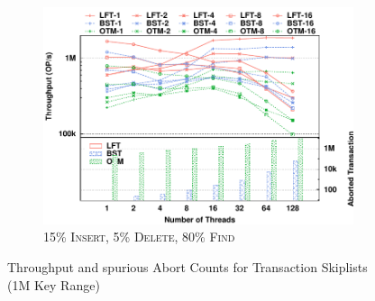 \documentclass[]{sig-alternate-05-2015}
\begin{document}
\begin{figure}[p]
\begin{subfigure}{1\columnwidth}
        \includegraphics[width=1\columnwidth]{./data/amdskip15ins10kfilled.pdf}
        \vspace{-0.17in}
        \caption{15\% \textsc{Insert}, 5\% \textsc{Delete}, 80\% \textsc{Find}}
        \label{fig:txnskip15}
    \end{subfigure}
    \caption{Throughput and spurious Abort Counts for Transaction Skiplists (1M Key Range)}
    \label{fig:txnskip}
    \vspace{-0.2in}
\end{figure}



\clearpage


\end{document}
